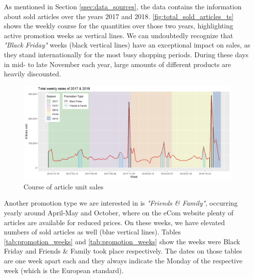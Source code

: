 


As mentioned in Section \ref{ssec:data_sources}, the data contains the information about sold articles over the years 2017 and 2018. \autoref{fig:total_sold_articles_ts} shows the weekly course for the quantities over those two years, highlighting active promotion weeks as vertical lines. We can undoubtedly recognize that \textit{"Black Friday"} weeks (black vertical lines) have an exceptional impact on sales, as they stand internationally for the most busy shopping periods. During these days in mid- to late November each year, large amounts of different products are heavily discounted.
\\

\begin{figure}[H]
\centering
  \includegraphics[width=1\linewidth]{figures/total_sold_articles_ts.png}
  \caption{Course of article unit sales}
  \label{fig:total_sold_articles_ts}
\end{figure}

Another promotion type we are interested in is \textit{"Friends \& Family"}, occurring yearly around April-May and October, where on the eCom website plenty of articles are available for reduced prices. On these weeks, we have elevated numbers of sold articles as well (blue vertical lines). Tables \ref{tab:promotion_weeks} and \ref{tab:promotion_weeks} show the weeks were Black Friday and Friends \& Family took place respectively. The dates on those tables are one week apart each and they always indicate the Monday of the respective week (which is the European standard).
\\



